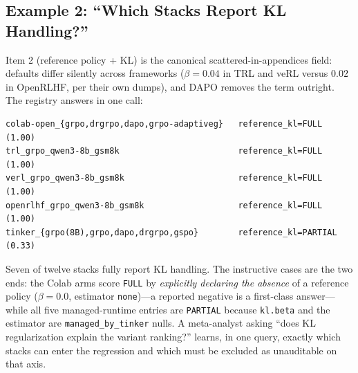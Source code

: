 \subsection{Example 2: ``Which Stacks Report KL Handling?''}
\label{sec:p6-worked-kl}
Item 2 (reference policy + KL) is the canonical scattered-in-appendices
field: defaults differ silently across frameworks ($\beta{=}0.04$ in TRL and
veRL versus $0.02$ in OpenRLHF, per their own dumps), and DAPO removes the
term outright. The registry answers in one call:

\begin{lstlisting}[basicstyle=\ttfamily\scriptsize, frame=single,
  caption={\texttt{query --item reference_kl} on the seed entries
  (grouped).}, label={lst:p6-klquery}]
colab-open_{grpo,drgrpo,dapo,grpo-adaptiveg}   reference_kl=FULL (1.00)
trl_grpo_qwen3-8b_gsm8k                        reference_kl=FULL (1.00)
verl_grpo_qwen3-8b_gsm8k                       reference_kl=FULL (1.00)
openrlhf_grpo_qwen3-8b_gsm8k                   reference_kl=FULL (1.00)
tinker_{grpo(8B),grpo,dapo,drgrpo,gspo}        reference_kl=PARTIAL (0.33)
\end{lstlisting}

Seven of twelve stacks fully report KL handling. The instructive cases are the
two ends: the Colab arms score \texttt{FULL} by \emph{explicitly declaring the
absence} of a reference policy ($\beta{=}0.0$, estimator \texttt{none})---a
reported negative is a first-class answer---while all five managed-runtime
entries are \texttt{PARTIAL} because \texttt{kl.beta} and the estimator are
\texttt{managed_by_tinker} nulls. A meta-analyst asking ``does KL
regularization explain the variant ranking?'' learns, in one query, exactly
which stacks can enter the regression and which must be excluded as
unauditable on that axis.
